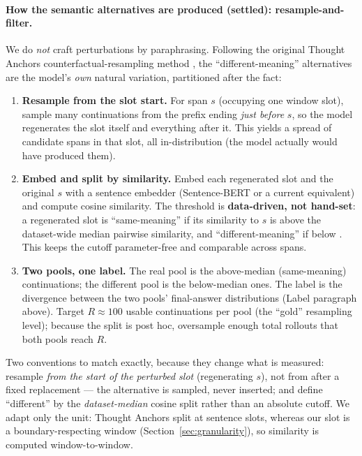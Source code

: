 \documentclass[11pt]{article}
\begin{document}
\paragraph{How the semantic alternatives are produced (settled): resample-and-filter.}
\label{sec:perturb}
We do \emph{not} craft perturbations by paraphrasing. Following the original Thought Anchors counterfactual-resampling method \cite{bogdan2025thoughtanchors}, the ``different-meaning'' alternatives are the model's \emph{own} natural variation, partitioned after the fact:
\begin{enumerate}[leftmargin=1.7em]
  \item \textbf{Resample from the slot start.} For span $s$ (occupying one window slot), sample many continuations from the prefix ending \emph{just before} $s$, so the model regenerates the slot itself and everything after it. This yields a spread of candidate spans in that slot, all in-distribution (the model actually would have produced them).
  \item \textbf{Embed and split by similarity.} Embed each regenerated slot and the original $s$ with a sentence embedder (Sentence-BERT or a current equivalent) and compute cosine similarity. The threshold is \textbf{data-driven, not hand-set}: a regenerated slot is ``same-meaning'' if its similarity to $s$ is above the dataset-wide median pairwise similarity, and ``different-meaning'' if below \cite{bogdan2025thoughtanchors}. This keeps the cutoff parameter-free and comparable across spans.
  \item \textbf{Two pools, one label.} The real pool is the above-median (same-meaning) continuations; the different pool is the below-median ones. The label is the divergence between the two pools' final-answer distributions (Label paragraph above). Target $R \approx 100$ usable continuations per pool (the ``gold'' resampling level); because the split is post hoc, oversample enough total rollouts that both pools reach $R$.
\end{enumerate}
Two conventions to match exactly, because they change what is measured: resample \emph{from the start of the perturbed slot} (regenerating $s$), not from after a fixed replacement --- the alternative is sampled, never inserted; and define ``different'' by the \emph{dataset-median} cosine split rather than an absolute cutoff. We adapt only the unit: Thought Anchors split at sentence slots, whereas our slot is a boundary-respecting window (Section~\ref{sec:granularity}), so similarity is computed window-to-window.
\end{document}
